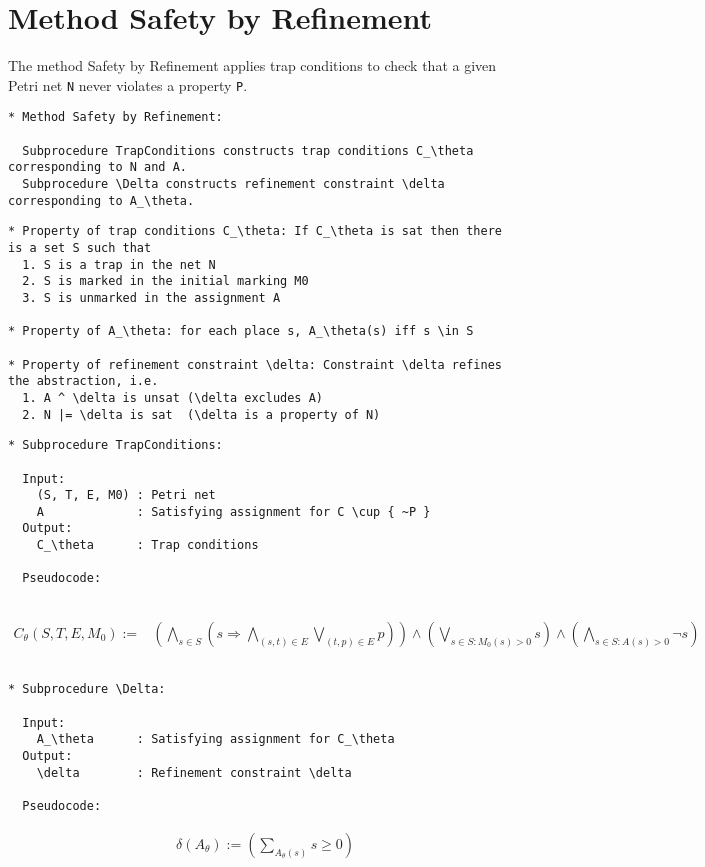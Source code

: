 \newpage

\section{Method Safety by Refinement}

The method Safety by Refinement applies trap conditions to check that a given Petri net \verb=N= never violates a property \verb=P=.

\begin{verbatim}
* Method Safety by Refinement:

  Subprocedure TrapConditions constructs trap conditions C_\theta corresponding to N and A.
  Subprocedure \Delta constructs refinement constraint \delta corresponding to A_\theta.
\end{verbatim}




\begin{verbatim}
* Property of trap conditions C_\theta: If C_\theta is sat then there is a set S such that
  1. S is a trap in the net N
  2. S is marked in the initial marking M0
  3. S is unmarked in the assignment A

* Property of A_\theta: for each place s, A_\theta(s) iff s \in S

* Property of refinement constraint \delta: Constraint \delta refines the abstraction, i.e.
  1. A ^ \delta is unsat (\delta excludes A)
  2. N |= \delta is sat  (\delta is a property of N)
\end{verbatim}

\newpage

\begin{verbatim}
* Subprocedure TrapConditions:

  Input:
    (S, T, E, M0) : Petri net
    A             : Satisfying assignment for C \cup { ~P }
  Output:
    C_\theta      : Trap conditions

  Pseudocode:
  
\end{verbatim}
\begin{align*}
  C_\theta(S, T, E, M_0) :=& \left( \bigwedge_{s \in S} \left( s \Rightarrow
      \bigwedge_{(s, t) \in E} \bigvee_{(t, p) \in E} p
    \right) \right) \land
    \left( \bigvee_{s \in S: M_0(s) > 0} s \right) \land
    \left( \bigwedge_{s \in S: A(s) > 0} \neg s \right)
\end{align*}
\begin{verbatim}

* Subprocedure \Delta:

  Input:
    A_\theta      : Satisfying assignment for C_\theta
  Output:
    \delta        : Refinement constraint \delta

  Pseudocode:

\end{verbatim}
\begin{align*}
  & \delta(A_\theta) := \left( \sum_{A_\theta(s)} s \ge 0 \right)
\end{align*}


